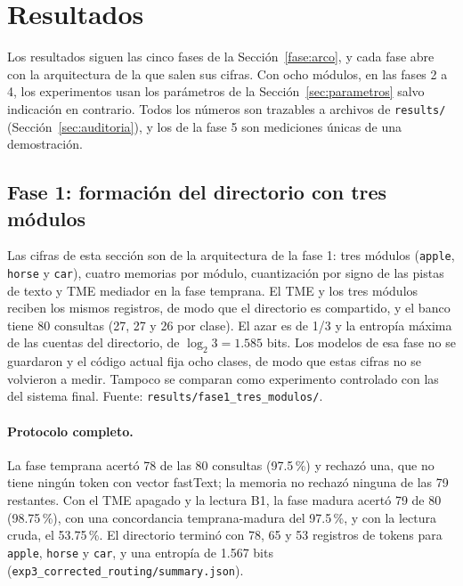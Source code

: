 \section{Resultados}
\label{sec:resultados}

Los resultados siguen las cinco fases de la Sección~\ref{fase:arco}, y cada fase abre
con la arquitectura de la que salen sus cifras.
Con ocho módulos, en las fases 2 a 4, los experimentos usan los parámetros de la
Sección~\ref{sec:parametros} salvo indicación en contrario.
Todos los números son trazables a archivos de \texttt{results/}
(Sección~\ref{sec:auditoria}), y los de la fase 5 son mediciones únicas de una
demostración.

\subsection{Fase 1: formación del directorio con tres módulos}
\label{sec:fase1-resultados}

Las cifras de esta sección son de la arquitectura de la fase 1: tres módulos
(\texttt{apple}, \texttt{horse} y \texttt{car}), cuatro memorias por módulo,
cuantización por signo de las pistas de texto y TME mediador en la fase temprana.
El TME y los tres módulos reciben los mismos registros, de modo que el directorio es
compartido, y el banco tiene 80 consultas (27, 27 y 26 por clase).
El azar es de 1/3 y la entropía máxima de las cuentas del directorio, de
$\log_2 3 = 1.585$ bits.
Los modelos de esa fase no se guardaron y el código actual fija ocho clases, de modo que
estas cifras no se volvieron a medir.
Tampoco se comparan como experimento controlado con las del sistema final.
Fuente: \texttt{results/fase1\_tres\_modulos/}.

\paragraph{Protocolo completo.}
La fase temprana acertó 78 de las 80 consultas (97.5\,\%) y rechazó una, que no tiene
ningún token con vector fastText; la memoria no rechazó ninguna de las 79 restantes.
Con el TME apagado y la lectura B1, la fase madura acertó 79 de 80 (98.75\,\%), con una
concordancia temprana-madura del 97.5\,\%, y con la lectura cruda, el 53.75\,\%.
El directorio terminó con 78, 65 y 53 registros de tokens para \texttt{apple},
\texttt{horse} y \texttt{car}, y una entropía de 1.567 bits
(\texttt{exp3\_corrected\_routing/summary.json}).

